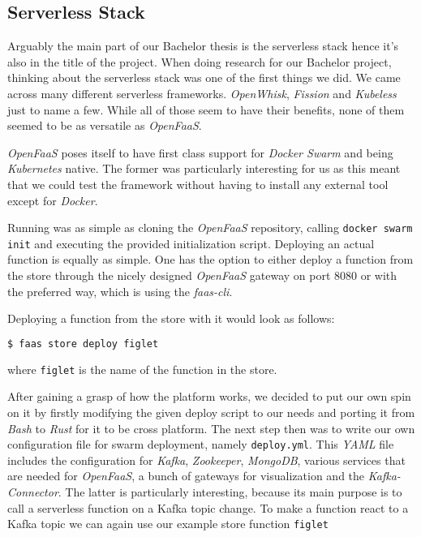 \subsection{Serverless Stack}

Arguably the main part of our Bachelor thesis is the serverless stack hence it's also in the title
of the project. When doing research for our Bachelor project, thinking about the serverless stack
was one of the first things we did. We came across many different serverless frameworks.
\textit{OpenWhisk}, \textit{Fission} and \textit{Kubeless} just to name a few. While all of those
seem to have their benefits, none of them seemed to be as versatile as \textit{OpenFaaS}.

\textit{OpenFaaS} poses itself to have first class support for \textit{Docker Swarm} and being
\textit{Kubernetes} native. The former was particularly interesting for us as this meant that we
could test the framework without having to install any external tool except for  \textit{Docker}.

Running was as simple as cloning the \textit{OpenFaaS} repository, calling \texttt{docker swarm
init} and executing the provided initialization script. Deploying an actual function is equally as
simple. One has the option to either deploy a function from the store through the nicely designed
\textit{OpenFaaS} gateway on port 8080 or with the preferred way, which is using the
\textit{faas-cli}.

Deploying a function from the store with it would look as follows:

\begin{lstlisting}[language=bash]
  $ faas store deploy figlet
\end{lstlisting}

where \texttt{figlet} is the name of the function in the store.

After gaining a grasp of how the platform works, we decided to put our own spin on it by firstly
modifying the given deploy script to our needs and porting it from \textit{Bash} to \textit{Rust}
for it to be cross platform. The next step then was to write our own configuration file for swarm
deployment, namely \texttt{deploy.yml}. This \textit{YAML} file includes the configuration for
\textit{Kafka}, \textit{Zookeeper}, \textit{MongoDB}, various services that are needed for
\textit{OpenFaaS}, a bunch of gateways for visualization and the \textit{Kafka-Connector}. The
latter is particularly interesting, because its main purpose is to call a serverless function on a
Kafka topic change. To make a function react to a Kafka topic we can again use our example store
function \texttt{figlet}

